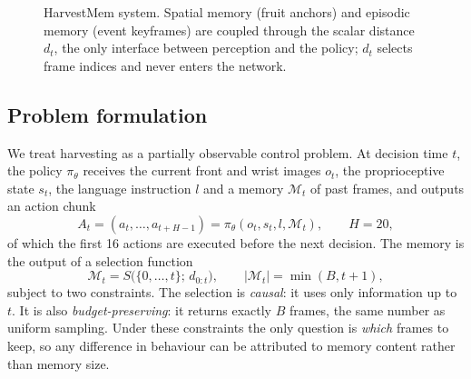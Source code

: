 \begin{figure}[t]
\centering
{}
\caption{HarvestMem system. Spatial memory (fruit anchors) and episodic memory (event keyframes) are coupled through the scalar distance $d_t$, the only interface between perception and the policy; $d_t$ selects frame indices and never enters the network.}
\label{fig:system}
\end{figure}

\subsection{Problem formulation}
\label{sec:formulation}
We treat harvesting as a partially observable control problem. At decision time $t$, the policy $\pi_\theta$ receives the current front and wrist images $o_t$, the proprioceptive state $s_t$, the language instruction $l$ and a memory $\mathcal{M}_t$ of past frames, and outputs an action chunk
\begin{equation}
A_t = (a_t,\dots,a_{t+H-1}) = \pi_\theta(o_t, s_t, l, \mathcal{M}_t),\qquad H=20,
\end{equation}
of which the first 16 actions are executed before the next decision. The memory is the output of a selection function
\begin{equation}
\mathcal{M}_t = S\big(\{0,\dots,t\};\, d_{0:t}\big),\qquad |\mathcal{M}_t| = \min(B, t+1),
\label{eq:selection}
\end{equation}
subject to two constraints. The selection is \emph{causal}: it uses only information up to $t$. It is also \emph{budget-preserving}: it returns exactly $B$ frames, the same number as uniform sampling. Under these constraints the only question is \emph{which} frames to keep, so any difference in behaviour can be attributed to memory content rather than memory size.

